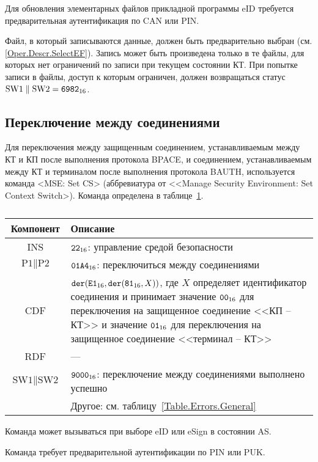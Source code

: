 Для обновления элементарных файлов прикладной программы eID 
требуется предварительная аутентификация по CAN или PIN.

Файл, в который записываются данные, должен быть предварительно
выбран (см. \ref{Oper.Descr.SelectEF}).
Запись может быть произведена только в те файлы, для которых 
нет ограничений по записи при текущем состоянии КТ. 
При попытке записи в файлы, доступ к которым ограничен, 
должен возвращаться статус $\text{SW1} \parallel\text{SW2} = \texttt{6982}_{16}$. 

\subsection{Переключение между соединениями}
\label{Oper.Descr.SetCS}

Для переключения между защищенным соединением,
устанавливаемым между КТ и КП после выполнения 
протокола BPACE, и соединением, 
устанавливаемым между КТ и терминалом после выполнения 
протокола BAUTH, используется команда <MSE: Set CS> (аббревиатура от <<Manage 
Security Environment: Set Context Switch>).
Команда определена в таблице~\ref{Table.Oper.SetCSCmd}.

\begin{table}[hbt]
\caption{}\label{Table.Oper.SetCSCmd}
\begin{tabular}{|c|p{14cm}|}
\hline
Компонент & Описание \\
\hline
\hline
INS & $\texttt{22}_{16}$: управление средой безопасности\\ 
\hline
$\text{P1} \parallel\text{P2}$ & $\texttt{01A4}_{16}$: 
переключиться между соединениями \\
\hline
CDF & 
$\texttt{der}(\texttt{E1}_{16}, \texttt{der}(\texttt{81}_{16}, X))$, 
где $X$ определяет идентификатор
соединения и принимает значение $\texttt{00}_{16}$ для
переключения на защищенное соединение <<КП -- КТ>>
и значение $\texttt{01}_{16}$ для переключения на защищенное
соединение <<терминал -- КТ>>\\ 
\hline 
\hline
RDF &  --- \\
\hline
$\text{SW1} \parallel \text{SW2}$ & 
$\texttt{9000}_{16}$: переключение между соединениями выполнено успешно \\
\cline{2-2}
 & Другое: см. таблицу~\ref{Table.Errors.General} \\
\hline
\end{tabular}
\end{table}

Команда может вызываться при выборе eID или eSign в состоянии AS.

Команда требует предварительной аутентификации по PIN или PUK.

